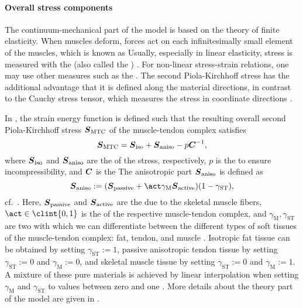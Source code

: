 \paragraph{Overall stress components}

The continuum-mechanical part of the model
is based on the theory of finite elasticity.
When muscles deform, forces act on each infinitesimally small element
of the muscles, which is known as 
Usually, especially in linear elasticity,
stress is measured with the 
(also called the ) \cite{Soennerlind13Why}.
For non-linear stress-strain relations,
one may use other measures such as the
.
The second Piola-Kirchhoff stress has the additional advantage
that it is defined along the material directions,
in contrast to the Cauchy stress tensor,
which measures the stress in coordinate directions \cite{Soennerlind13Why}.

In ,
the strain energy function is defined such that the
resulting overall second Piola-Kirchhoff stress ${\boldsymbol{S}}_\mathrm{MTC}$ of
the muscle-tendon complex satisfies
\begin{equation}
  {\boldsymbol{S}}_\mathrm{MTC}
  = {\boldsymbol{S}}_\mathrm{iso} + {\boldsymbol{S}}_\mathrm{aniso} - p {\boldsymbol{C}}^{-1},
\end{equation}
where ${\boldsymbol{S}}_\mathrm{iso}$ and ${\boldsymbol{S}}_\mathrm{aniso}$
are the  of the stress, respectively,
$p$ is the  to ensure incompressibility,
and ${\boldsymbol{C}}$ is the 
The anisotropic part ${\boldsymbol{S}}_\mathrm{aniso}$ is defined as
\begin{equation}
  \mat{S}_\mathrm{aniso}
  := (
    \mat{S}_\mathrm{passive} +
    \act \gamma_\mathrm{M} \mat{S}_\mathrm{active}
  ) (1 - \gamma_\mathrm{ST}),
\end{equation}
cf.\ \cite{Valentin18Gradient}.
Here, ${\boldsymbol{S}}_\mathrm{passive}$ and ${\boldsymbol{S}}_\mathrm{active}$
are the 
due to the skeletal muscle fibers,
$\act \in \clint{0, 1}$ is the  of the
respective muscle-tendon complex, and
$\gamma_\mathrm{M}, \gamma_\mathrm{ST}$ are two 
with which we can differentiate between the different types of soft tissues
of the muscle-tendon complex: fat, tendon, and muscle
\cite{Valentin18Gradient}.
Isotropic fat tissue can be obtained
by setting $\gamma_\mathrm{ST} := 1$,
passive anisotropic tendon tissue
by setting $\gamma_\mathrm{ST} := 0$ and $\gamma_\mathrm{M} := 0$, and
skeletal muscle tissue
by setting $\gamma_\mathrm{ST} := 0$ and $\gamma_\mathrm{M} := 1$.
A mixture of these pure materials is
achieved by linear interpolation when setting
$\gamma_\mathrm{M}$ and $\gamma_\mathrm{ST}$ to values between zero and one
\cite{Valentin18Gradient}.
More details about the theory part of the model are given in
.
